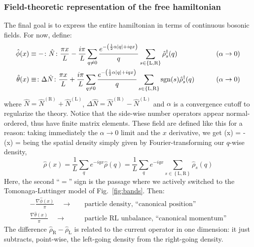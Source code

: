 \subsubsection{Field-theoretic representation of the free hamiltonian}

The final goal is to express the entire hamiltonian in terms of continuous bosonic fields. For now, define:
\[
\begin{aligned}
	\hat \phi(x) &\equiv - \colon \hat N \colon \frac{\pi x}{L} - \frac{i\pi}{L} \sum_{q \neq 0} \frac{e^{-\left( \frac{1}{2} \alpha \abs{q} + iqx \right)}}{q} \sum_{s \in \left\{\mathrm L, \mathrm R\right\}} \hat \rho_s^\dagger (q) &&\qquad\left( \alpha \to 0 \right) \\
	\hat \theta(x) &\equiv \colon \Delta \hat N \colon \frac{\pi x}{L} + \frac{i\pi}{L} \sum_{q \neq 0} \frac{e^{-\left( \frac{1}{2} \alpha \abs{q} + iqx \right)}}{q} \sum_{s \in \left\{\mathrm L, \mathrm R\right\}} \mathrm{sgn}(s) \hat \rho_s^\dagger (q) &&\qquad\left( \alpha \to 0 \right)
\end{aligned}
\]
where $\hat N = \hat N^{(\mathrm R)} + \hat N^{(\mathrm L)}$, $\Delta \hat N = \hat N^{(\mathrm R)} - \hat N^{(\mathrm L)}$ and $\alpha$ is a convergence cutoff to regularize the theory. Notice that the side-wise number operators appear normal-ordered, thus have finite matrix elements.
These field are defined like this for a reason: taking immediately the $\alpha \to 0$ limit and the $x$ derivative, we get
\beq\label{eq:fields-density-equations}
	\nabla \hat \phi(x) = - \pi {}
	\qquad
	\nabla \hat \theta(x) = \pi {}
\eeq
being the spatial density simply given by Fourier-transforming our $q$-wise density,
\[
	\hat \rho(x) = \frac{1}{L} \sum_q e^{-iqx} \hat \rho(q) = \frac{1}{L} \sum_q e^{-iqx} \sum_{s \in \left\{\mathrm L, \mathrm R\right\}} \hat \rho_s(q)
\]
Here, the second ``$=$'' sign is the passage where we actively switched to the Tomonaga-Luttinger model of Fig.~\ref{fig:bands}.
Then:
\[
\begin{aligned}
	- \frac{\nabla \hat \phi(x)}{\pi} \quad\to\quad &\text{particle density, ``canonical position''}\\
	\frac{\nabla \hat \theta(x)}{\pi} \quad\to\quad &\text{particle $\mathrm{RL}$ unbalance, ``canonical momentum''}
\end{aligned}
\]
The difference $\hat \rho_\mathrm{R} - \hat \rho_\mathrm{L}$ is related to the current operator in one dimension: it just subtracts, point-wise, the left-going density from the right-going density.

